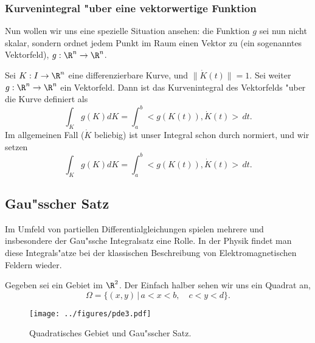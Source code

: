 \subsubsection{Kurvenintegral "uber eine vektorwertige Funktion}
Nun wollen wir uns eine spezielle Situation ansehen: die Funktion $g$ sei nun nicht skalar, 
sondern ordnet jedem Punkt im Raum einen Vektor zu (ein sogenanntes Vektorfeld), $g:\R^n\rightarrow\R^n$. 
\begin{sdefi} Sei $ K: I\rightarrow \R^n$ eine differenzierbare Kurve, und $\|\dot K(t)\|=1$. 
Sei weiter $g:\R^n\rightarrow\R^n$ ein Vektorfeld.
Dann ist das Kurvenintegral des Vektorfelds "uber die Kurve definiert als
$$ \int_{K} g(K) dK = \int_a^b <g(K(t)), \dot K(t)>\, dt.
$$
Im allgemeinen Fall ($\dot K$ beliebig) ist unser Integral schon
durch normiert, und wir setzen
$$ \int_{K} g(K) dK = \int_a^b <g(K(t)), \dot K(t)>\, dt.
$$
\end{sdefi}
\begin{auf}\chb\label{block9A2}

\end{auf}

\subsection{Gau"sscher Satz}

Im Umfeld von partiellen Differentialgleichungen spielen mehrere und 
insbesondere
der Gau"ssche  Integralsatz eine Rolle. In der Physik findet man
diese Integrals"atze bei der klassischen Beschreibung von Elektromagnetischen Feldern wieder.\par
Gegeben sei ein Gebiet im $\R^2$. Der Einfach halber sehen wir uns ein Quadrat an,
$$\Omega = \{(x,y)\,|\, a < x< b,\quad c<y<d\}.$$

\begin{figure}[htbp] %
   \centering
   \texttt{[image: ../figures/pde3.pdf]} 
   \caption{Quadratisches Gebiet und Gau"sscher Satz.}
   \label{pde3}
\end{figure}


